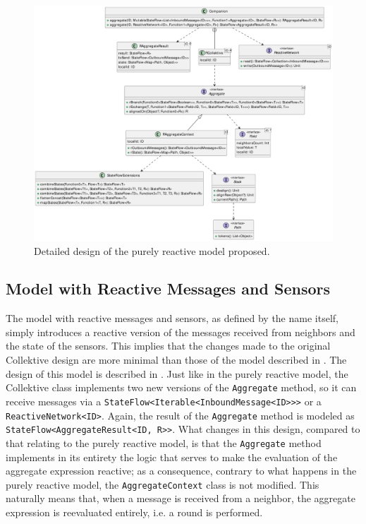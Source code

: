 \begin{figure}
    \centering
    \includegraphics[width=\linewidth]{figures/collektive-prm-design.pdf}
    \caption{Detailed design of the purely reactive model proposed.}
    \label{fig:collektive-prm-design}
\end{figure}

\subsection{Model with Reactive Messages and Sensors}

The model with reactive messages and sensors, as defined by the name itself, simply introduces a reactive version of the messages received from neighbors and the state of the sensors. This implies that the changes made to the original Collektive design are more minimal than those of the model described in . The design of this model is described in . Just like in the purely reactive model, the Collektive class implements two new versions of the \texttt{Aggregate} method, so it can receive messages via a \texttt{StateFlow<Iterable<InboundMessage<ID>>>} or a \texttt{ReactiveNetwork<ID>}. Again, the result of the \texttt{Aggregate} method is modeled as \texttt{StateFlow<AggregateResult<ID, R>>}. What changes in this design, compared to that relating to the purely reactive model, is that the \texttt{Aggregate} method implements in its entirety the logic that serves to make the evaluation of the aggregate expression reactive; as a consequence, contrary to what happens in the purely reactive model, the \texttt{AggregateContext} class is not modified. This naturally means that, when a message is received from a neighbor, the aggregate expression is reevaluated entirely, i.e. a round is performed.

